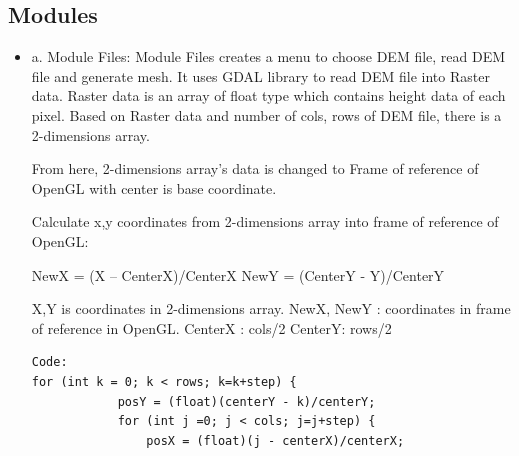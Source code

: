 \documentclass[11pt]{article}
\begin{document}
\subsection{Modules} 
\begin{itemize}
\item a. Module Files:
Module Files creates a menu to choose DEM file, read DEM file and generate mesh.
It uses GDAL library to read DEM file into Raster data.
Raster data is an array of float type which contains height data of each pixel. Based on Raster data and number of cols, rows of DEM file, there is a 2-dimensions array.

From here, 2-dimensions array's data is changed to Frame of reference of OpenGL with center is base coordinate.
\begin{figure}[H] 
  \label{fig:Base}
\end{figure} 
Calculate x,y coordinates from 2-dimensions array into frame of reference of OpenGL:

NewX = (X – CenterX)/CenterX
NewY = (CenterY - Y)/CenterY

X,Y is coordinates in 2-dimensions array.
NewX, NewY : coordinates in frame of reference in OpenGL.
CenterX : cols/2
CenterY: rows/2

\begin{lstlisting}
Code: 
for (int k = 0; k < rows; k=k+step) {
            posY = (float)(centerY - k)/centerY;
            for (int j =0; j < cols; j=j+step) {
                posX = (float)(j - centerX)/centerX;
\end{lstlisting}


\end{itemize}
\end{document}
